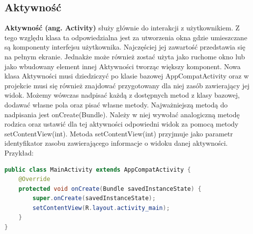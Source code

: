 \documentclass{article}
\numberwithin{equation}{section}
\begin{document}
\subsection{Aktywność}
\textbf{Aktywność (ang. Activity)} służy głównie do interakcji z użytkownikiem. Z tego względu klasa ta odpowiedzialna jest za utworzenia okna gdzie umieszczane są komponenty interfejsu użytkownika. Najczęściej jej zawartość przedstawia się na pełnym ekranie. Jednakże może również zostać użyta jako ruchome okno lub jako wbudowany element innej Aktywności tworząc większy komponent. Nowa klasa Aktywności musi dziedziczyć po klasie bazowej AppCompatActivity oraz w projekcie musi się również znajdować przygotowany dla niej zasób zawierający jej widok. Możemy wówczas nadpisać każdą z dostępnych metod z klasy bazowej, dodawać własne pola oraz pisać własne metody. Najważniejszą metodą do nadpisania jest onCreate(Bundle). Należy w niej wywołać analogiczną metodę rodzica oraz ustawić dla tej aktywności odpowiedni widok za pomocą metody setContentView(int). Metoda setContentView(int) przyjmuje jako parametr identyfikator zasobu zawierającego informacje o widoku danej aktywności.\citep{activity} Przykład:
\begin{lstlisting}[language=Java]
public class MainActivity extends AppCompatActivity {
    @Override
    protected void onCreate(Bundle savedInstanceState) {
        super.onCreate(savedInstanceState);
        setContentView(R.layout.activity_main);
    }
}
\end{lstlisting}
\end{document}

